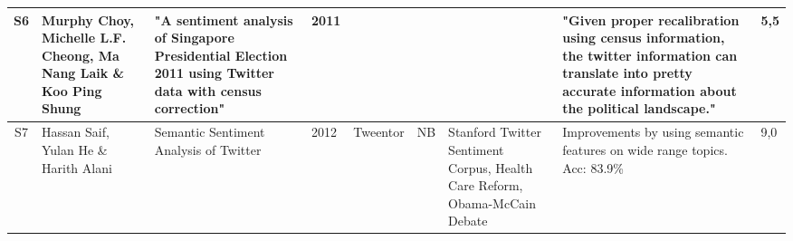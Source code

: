 \begin{sidewaystable}
\begin{longtable}{|c|p{3cm}|p{4cm}|p{0.6cm}|p{1cm}|p{1.3cm}|p{4cm}|p{3cm}|p{0.3cm}|}
    S6 & Murphy Choy, Michelle L.F. Cheong, Ma Nang Laik \& Koo Ping Shung & "A sentiment analysis of Singapore Presidential Election 2011 using Twitter data with census correction" & 2011 &  &  &  & "Given proper recalibration using census information, the twitter information can translate into pretty accurate information about the political landscape."  & 5,5 \\ \hline  
    
    S7 & Hassan Saif, Yulan He \& Harith Alani & Semantic Sentiment Analysis of Twitter & 2012 & Tweentor & NB & Stanford Twitter Sentiment Corpus, Health Care Reform, Obama-McCain Debate & Improvements by using semantic features on wide range topics. Acc: 83.9\%  & 9,0 \\ \hline  
    
    
    \end{longtable}
\end{sidewaystable}

